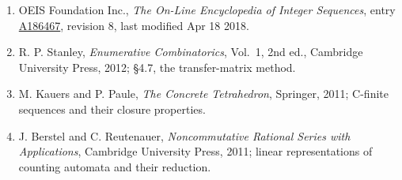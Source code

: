 \documentclass[11pt]{article}
\theoremstyle{definition}
\begin{document}
\begin{enumerate}

\item OEIS Foundation Inc., \emph{The On-Line Encyclopedia of Integer Sequences}, entry \href{https://oeis.org/A186467}{A186467}, revision 8, last modified Apr 18 2018.

\item R. P. Stanley, \emph{Enumerative Combinatorics}, Vol.~1, 2nd ed., Cambridge University Press, 2012; \S4.7, the transfer-matrix method.

\item M. Kauers and P. Paule, \emph{The Concrete Tetrahedron}, Springer, 2011; C-finite sequences and their closure properties.

\item J. Berstel and C. Reutenauer, \emph{Noncommutative Rational Series with Applications}, Cambridge University Press, 2011; linear representations of counting automata and their reduction.

\end{enumerate}
\end{document}
